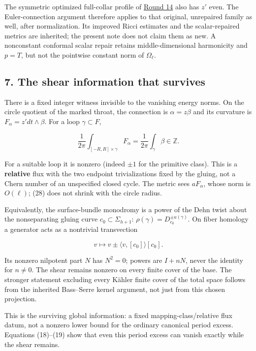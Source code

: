 \documentclass[
  11pt,
]{article}
\begin{document}
The symmetric optimized full-collar profile of
\href{round14_global.md}{Round 14} also has \(z'\) even. The
Euler-connection argument therefore applies to that original, unrepaired
family as well, after normalization. Its improved Ricci estimates and
the scalar-repaired metrics are inherited; the present note does not
claim them as new. A nonconstant conformal scalar repair retains
middle-dimensional harmonicity and \(p=T\), but not the pointwise
constant norm of \(\Omega_\ell\).

\hypertarget{the-shear-information-that-survives}{%
\subsection{7. The shear information that
survives}\label{the-shear-information-that-survives}}

There is a fixed integer witness invisible to the vanishing energy
norms. On the circle quotient of the marked throat, the connection is
\(\alpha=z\beta\) and its curvature is \(F_\alpha=z' dt\wedge\beta\).
For a loop \(\gamma\subset F\),

\[
 \frac1{2\pi}\int_{[-R,R]\times\gamma}F_\alpha
 =\frac1{2\pi}\int_\gamma\beta\in\mathbb Z.
 \tag{28}
\]

For a suitable loop it is nonzero (indeed \(\pm1\) for the primitive
class). This is a \textbf{relative} flux with the two endpoint
trivializations fixed by the gluing, not a Chern number of an
unspecified closed cycle. The metric sees \(aF_\alpha\), whose norm is
\(O(\ell)\); (28) does not shrink with the circle radius.

Equivalently, the surface-bundle monodromy is a power of the Dehn twist
about the nonseparating gluing curve \(c_0\subset\Sigma_{h+1}\):
\(\rho(\gamma)=D_{c_0}^{\pm u(\gamma)}\). On fiber homology a generator
acts as a nontrivial transvection

\[
 v\longmapsto v\pm\langle v,[c_0]\rangle[c_0].
 \tag{29}
\]

Its nonzero nilpotent part \(N\) has \(N^2=0\); powers are \(I+nN\),
never the identity for \(n\ne0\). The shear remains nonzero on every
finite cover of the base. The stronger statement excluding every Kähler
finite cover of the total space follows from the inherited Bass--Serre
kernel argument, not just from this chosen projection.

This is the surviving global information: a fixed mapping-class/relative
flux datum, not a nonzero lower bound for the ordinary canonical period
excess. Equations (18)--(19) show that even this period excess can
vanish exactly while the shear remains.
\end{document}
